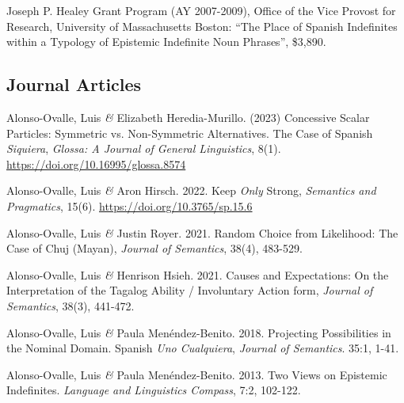 \documentclass[11pt]{article}
\begin{document}
Joseph P. Healey Grant Program (AY 2007-2009), Office of the Vice Provost for Research, University of Massachusetts Boston: ``The Place of Spanish Indefinites within a Typology of Epistemic Indefinite Noun Phrases'', \$3,890.


\subsection*{Journal Articles}

Alonso-Ovalle, Luis \textit{\&} Elizabeth Heredia-Murillo. (2023) Concessive Scalar Particles:
Symmetric vs. Non-Symmetric Alternatives.
The Case of Spanish \textit{Siquiera}, \textit{Glossa: A Journal of General Linguistics}, 8(1). \href{https://doi.org/10.16995/glossa.8574}{https://doi.org/10.16995/glossa.8574}

 
Alonso-Ovalle, Luis \textit{\&} Aron Hirsch. 2022. Keep \textit{Only} Strong,  \textit{Semantics and Pragmatics}, 15(6). \href{https://doi.org/10.3765/sp.15.6}{https://doi.org/10.3765/sp.15.6}

Alonso-Ovalle, Luis \textit{\&} Justin Royer. 2021. Random Choice from Likelihood: The Case of Chuj (Mayan), \textit{Journal of Semantics}, 38(4), 483-529. 


Alonso-Ovalle, Luis \textit{\&} Henrison Hsieh. 2021. Causes and Expectations: On the Interpretation of the Tagalog Ability / Involuntary Action form, \textit{Journal of Semantics}, 38(3), 441-472.%

Alonso-Ovalle, Luis \textit{\&} Paula Men\'endez-Benito. 2018. Projecting Possibilities in the Nominal Domain. Spanish \textit{Uno Cualquiera}, \textit{Journal of Semantics}. 35:1, 1-41. %


Alonso-Ovalle, Luis \textit{\&} Paula
    Men\'endez-Benito. 2013. Two Views on Epistemic
    Indefinites. \textit{Language and Linguistics Compass}, 7:2, 102-122. 
\end{document}

